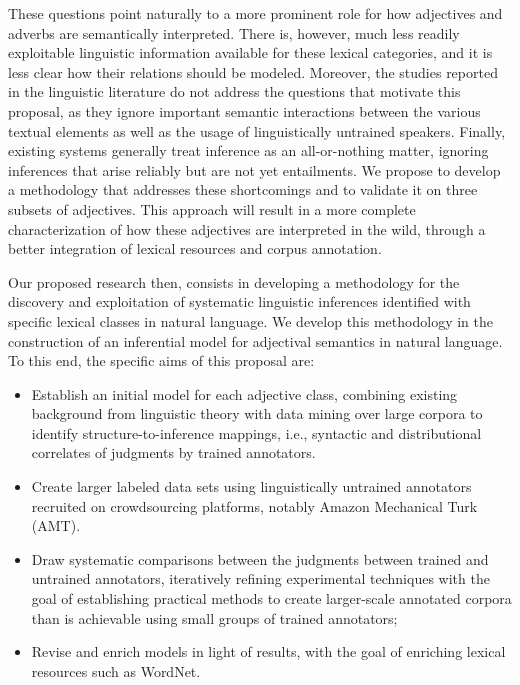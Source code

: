 \documentclass[10pt]{article}
\newcommand{\moveup}{\vspace*{-1.8mm}}
\begin{document}
These questions point naturally to a more prominent role for how adjectives and adverbs are semantically interpreted. There is, however, much less readily exploitable linguistic information available for these lexical categories, and it is less clear how their relations should be modeled. 
Moreover, the studies reported in the linguistic literature do not address the questions that motivate this proposal, as they ignore important semantic interactions 
between the various textual elements as well as the usage of linguistically untrained  speakers. 
Finally, existing systems generally treat inference as an all-or-nothing matter, ignoring inferences that arise reliably but are not yet entailments.
We propose to develop a methodology that addresses these shortcomings and to validate it on three subsets of adjectives.
This approach will result in a more complete characterization of how  these adjectives are interpreted in the wild, through a better integration of lexical resources   and corpus annotation. 
 
Our proposed research then, consists  in developing a methodology for the discovery and exploitation of systematic linguistic inferences identified with specific lexical classes in natural language. We develop this methodology in the construction of an inferential model for adjectival semantics in natural language. To this end, the specific aims of this proposal are:


\begin{itemize}

\moveup
\item Establish an initial model for each adjective class, combining existing background from linguistic theory with data mining over large corpora to identify structure-to-inference mappings, i.e., syntactic and distributional correlates of judgments by trained annotators.
\moveup
\item Create larger labeled data sets using linguistically untrained annotators recruited on crowdsourcing platforms, notably Amazon Mechanical Turk (AMT).
\moveup 
\item Draw systematic comparisons between the judgments between trained and untrained annotators, iteratively refining experimental techniques with the goal of establishing practical methods to create larger-scale annotated corpora than is achievable using small groups of trained annotators; 
\moveup
\item Revise and enrich models in light of results, with the goal of enriching lexical resources such as WordNet.  
\end{itemize}
\moveup
\end{document}
